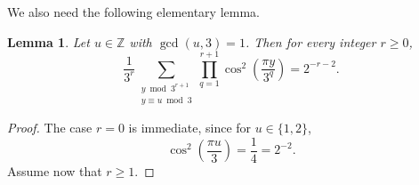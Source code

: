\documentclass[10pt,a4paper]{amsart}
\numberwithin{equation}{section} %
\newtheorem{lem}[thm]{Lemma}
\newcommand{\Z}{\mathbb{Z}}
\begin{document}
We also need the following elementary lemma.

\begin{lem}\label{lemaverageCOS2}
	Let $u\in\Z$ with $\gcd(u,3)=1$. Then  for every integer $r\ge 0$,
	\begin{equation*}
		\frac{1}{3^r}\sum_{\substack{y\bmod 3^{r+1}\\ y\equiv u\bmod 3}}
		\prod_{q=1}^{r+1}
		\cos^2\left(\frac{\pi y}{3^q}\right)
		=2^{-r-2}.
	\end{equation*}
\end{lem}

\begin{proof}
The case \(r=0\) is immediate, since for $u\in \{1,2\}$, 
\begin{equation}\label{eqcos222}
\cos^2\left(\frac{\pi u}{3}\right)=\frac14=2^{-2}.
\end{equation}
Assume now that \(r\ge 1\).	



\end{proof}
\end{document}
